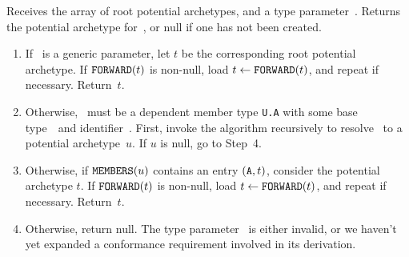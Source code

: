 \documentclass[../generics]{subfiles}
\begin{document}
\begin{algorithm}\label{archetype builder lookup} Receives the array of root potential archetypes, and a type parameter~\tT. Returns the potential archetype for~\tT, or null if one has not been created.
\begin{enumerate}
\item If \tT\ is a generic parameter, let $t$ be the corresponding root potential archetype. If $\texttt{FORWARD}(t)$ is non-null, load $t\leftarrow\texttt{FORWARD}(t)$, and repeat if necessary. Return~$t$.
\item Otherwise, \tT\ must be a dependent member type \texttt{U.A} with some base type~\tU\ and identifier~\nA. First, invoke the algorithm recursively to resolve \tU\ to a potential archetype~$u$. If $u$ is null, go to Step~4.
\item Otherwise, if $\texttt{MEMBERS}(u)$ contains an entry $(\texttt{A}, t)$, consider the potential archetype $t$. If $\texttt{FORWARD}(t)$ is non-null, load $t\leftarrow\texttt{FORWARD}(t)$, and repeat if necessary. Return~$t$.
\item Otherwise, return null. The type parameter \tT\ is either invalid, or we haven't yet expanded a conformance requirement involved in its derivation.
\end{enumerate}
\end{algorithm}
\end{document}
